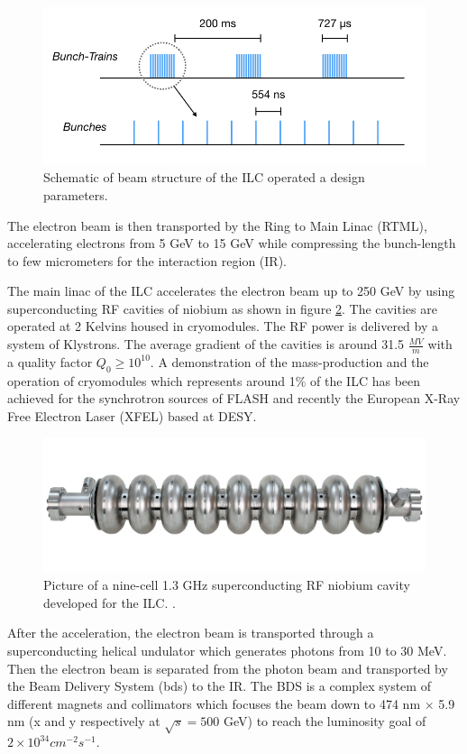\begin{figure}[htbp!]
  \centering
  \includegraphics[width=0.7\linewidth]{chap2/fig/BeamStructure.jpeg}
  \caption{Schematic of beam structure of the ILC operated a design parameters.} \label{fig:ILC_BeamStruct}
\end{figure}


The electron beam is then transported by the Ring to Main Linac (RTML), accelerating electrons from 5 GeV to 15 GeV while compressing the bunch-length to few micrometers for the interaction region (IR).

The main linac of the ILC accelerates the electron beam up to 250 GeV by using superconducting RF cavities of niobium as shown in figure \ref{fig:CavityNiobium}. The cavities are operated at 2 Kelvins housed in cryomodules. The RF power is delivered by a system of Klystrons. The average gradient of the cavities is around 31.5 $\frac{MV}{m}$ with a quality factor $Q_0 \geqslant 10^{10}$. A demonstration of the mass-production and the operation of cryomodules which represents around 1\% of the ILC has been achieved for the synchrotron sources of FLASH and recently the European X-Ray Free Electron Laser (XFEL) \cite{Altarelli:2006zza} based at DESY.

\begin{figure}[htbp!]
  \centering
  \includegraphics[width=0.7\linewidth]{chap2/fig/CavityNiobium.png}
  \caption{Picture of a nine-cell 1.3 GHz superconducting RF niobium cavity developed for the ILC. \cite{ILC_TDR_Vol3.1}.} \label{fig:CavityNiobium}
\end{figure}

After the acceleration, the electron beam is transported through a superconducting helical undulator which generates photons from 10 to 30 MeV. Then the electron beam is separated from the photon beam and transported by the Beam Delivery System (\acrshort{bds}) to the IR. The BDS is a complex system of different magnets and collimators which focuses the beam down to 474 nm $\times$ 5.9 nm (x and y respectively at $\sqrt{s} = 500$ GeV) to reach the luminosity goal of $2 \times 10^{34} cm^{-2}s^{-1}$.

